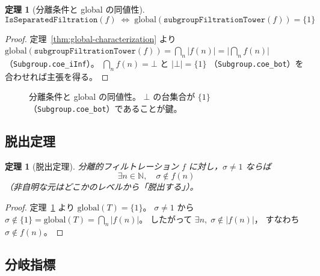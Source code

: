 \documentclass[a4paper,11pt]{ltjsarticle}
\theoremstyle{definition}
\theoremstyle{plain}
\newtheorem{theorem}[definition]{定理}
\theoremstyle{remark}
\begin{document}
\begin{theorem}[分離条件と global の同値性]\label{thm:separated-global}
  \[
    \texttt{IsSeparatedFiltration}(f)
    \;\Longleftrightarrow\;
    \mathrm{global}(\texttt{subgroupFiltrationTower}(f)) = \{1\}
  \]
\end{theorem}

\begin{proof}
  定理~\ref{thm:global-characterization} より
  $\mathrm{global}(\texttt{subgroupFiltrationTower}(f))
   = \bigcap_{n} \lvert f(n)\rvert
   = \lvert \bigcap_{n} f(n) \rvert$
  （\texttt{Subgroup.coe\_iInf}）。
  $\bigcap_{n} f(n) = \bot$ と $\lvert \bot \rvert = \{1\}$
  （\texttt{Subgroup.coe\_bot}）を合わせれば主張を得る。
\end{proof}

\begin{figure}[H]
\centering
{}
\caption{分離条件と global の同値性。
$\bot$ の台集合が $\{1\}$（\texttt{Subgroup.coe\_bot}）であることが鍵。}
\label{fig:separated-equiv}
\end{figure}

\subsection{脱出定理}

\begin{theorem}[脱出定理]\label{thm:escape}
  分離的フィルトレーション $f$ に対し，$\sigma \neq 1$ ならば
  \[
    \exists n \in \mathbb{N},\quad \sigma \notin f(n)
  \]
  （非自明な元はどこかのレベルから「脱出する」）。
\end{theorem}

\begin{proof}
  定理~\ref{thm:separated-global} より
  $\mathrm{global}(T) = \{1\}$。
  $\sigma \neq 1$ から $\sigma \notin \{1\} = \mathrm{global}(T) = \bigcap_n \lvert f(n)\rvert$。
  したがって $\exists n,\;\sigma \notin \lvert f(n)\rvert$，
  すなわち $\sigma \notin f(n)$。
\end{proof}

\subsection{分岐指標}
\end{document}
